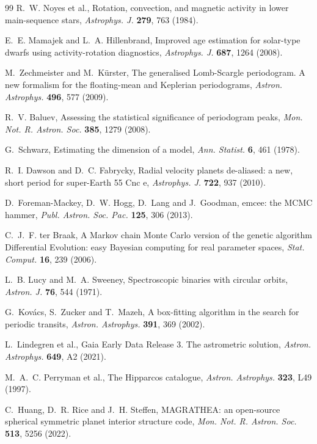 \documentclass[3p,11pt]{elsarticle}
\begin{document}
\begin{thebibliography}{99}
R.~W. Noyes et al., Rotation, convection, and magnetic activity in lower main-sequence stars,
\emph{Astrophys. J.} \textbf{279}, 763 (1984).

E.~E. Mamajek and L.~A. Hillenbrand, Improved age estimation for solar-type dwarfs using
activity-rotation diagnostics, \emph{Astrophys. J.} \textbf{687}, 1264 (2008).

M.~Zechmeister and M.~K\"urster, The generalised Lomb-Scargle periodogram. A new formalism for the
floating-mean and Keplerian periodograms, \emph{Astron. Astrophys.} \textbf{496}, 577 (2009).

R.~V. Baluev, Assessing the statistical significance of periodogram peaks, \emph{Mon. Not. R. Astron.
Soc.} \textbf{385}, 1279 (2008).

G.~Schwarz, Estimating the dimension of a model, \emph{Ann. Statist.} \textbf{6}, 461 (1978).

R.~I. Dawson and D.~C. Fabrycky, Radial velocity planets de-aliased: a new, short period for super-Earth
55 Cnc e, \emph{Astrophys. J.} \textbf{722}, 937 (2010).

D.~Foreman-Mackey, D.~W. Hogg, D.~Lang and J.~Goodman, emcee: the MCMC hammer, \emph{Publ. Astron. Soc.
Pac.} \textbf{125}, 306 (2013).

C.~J.~F. ter Braak, A Markov chain Monte Carlo version of the genetic algorithm Differential Evolution:
easy Bayesian computing for real parameter spaces, \emph{Stat. Comput.} \textbf{16}, 239 (2006).

L.~B. Lucy and M.~A. Sweeney, Spectroscopic binaries with circular orbits, \emph{Astron. J.}
\textbf{76}, 544 (1971).

G.~Kov\'acs, S.~Zucker and T.~Mazeh, A box-fitting algorithm in the search for periodic transits,
\emph{Astron. Astrophys.} \textbf{391}, 369 (2002).

L.~Lindegren et al., Gaia Early Data Release 3. The astrometric solution, \emph{Astron. Astrophys.}
\textbf{649}, A2 (2021).

M.~A.~C. Perryman et al., The Hipparcos catalogue, \emph{Astron. Astrophys.} \textbf{323}, L49 (1997).

C.~Huang, D.~R. Rice and J.~H. Steffen, MAGRATHEA: an open-source spherical symmetric planet interior
structure code, \emph{Mon. Not. R. Astron. Soc.} \textbf{513}, 5256 (2022).

\end{thebibliography}
\end{document}

